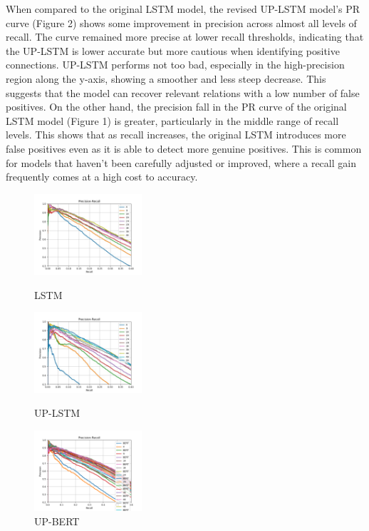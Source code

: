\documentclass[conference]{IEEEtran}
\begin{document}
When compared to the original LSTM model, the revised UP-LSTM model's PR curve (Figure 2) shows some improvement in precision across almost all levels of recall. The curve remained more precise at lower recall thresholds, indicating that the UP-LSTM is lower accurate but more cautious when identifying positive connections. UP-LSTM performs not too bad, especially in the high-precision region along the y-axis, showing a smoother and less steep decrease. This suggests that the model can recover relevant relations with a low number of false positives. On the other hand, the precision fall in the PR curve of the original LSTM model (Figure 1) is greater, particularly in the middle range of recall levels. This shows that as recall increases, the original LSTM introduces more false positives even as it is able to detect more genuine positives. This is common for models that haven't been carefully adjusted or improved, where a recall gain frequently comes at a high cost to accuracy.

\begin{figure}[H]
    \centering
    \begin{minipage}[t]{0.24\textwidth}
        \centering
        \includegraphics[width=4cm]{original.jpg}
        \caption{LSTM}
        \label{fig:lstm}
    \end{minipage}
    \begin{minipage}[t]{0.24\textwidth}
         \centering
         \includegraphics[width=4cm]{improved.jpg}
         \caption{UP-LSTM}
         \label{fig:up-lstm}
    \end{minipage}
    \begin{minipage}[t]{0.24\textwidth}
        \centering
        \includegraphics[width=4cm]{UP-BERT.png}
        \caption{UP-BERT}
        \label{fig:up-bert}
    \end{minipage}
\end{figure}
\end{document}
